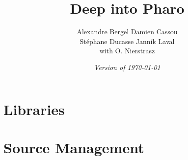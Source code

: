 \documentclass[a4paper,10pt,twoside]{book}
\begin{document}
\frontmatter
\setcounter{page}{1}
\pagestyle{headings}
\author{
	Alexandre Bergel\quad 
	Damien Cassou\quad \\
	St\'ephane Ducasse\quad 
	Jannik Laval\\ with O. Nierstrasz}
\title{\Huge\bf Deep into Pharo}
\isodate
\date{\emph{Version of \today}}
\maketitle
\tableofcontents
\sloppy %
\mainmatter



\part{Libraries}



 








\part{Source Management}





\end{document}
